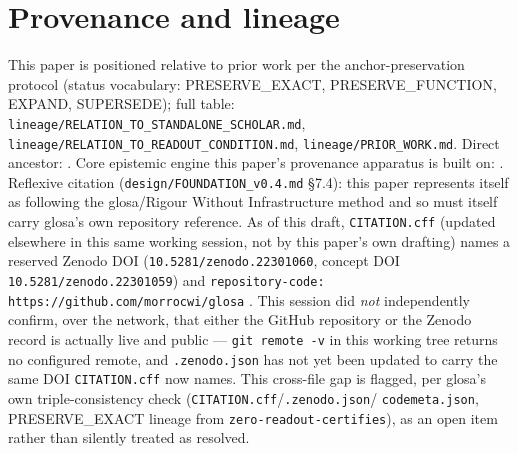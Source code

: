 \documentclass[11pt]{article}
\begin{document}
\section{Provenance and lineage}
\label{sec:provenance}
This paper is positioned relative to prior work per the anchor-preservation protocol (status
vocabulary: \textsc{PRESERVE\_EXACT}, \textsc{PRESERVE\_FUNCTION}, \textsc{EXPAND},
\textsc{SUPERSEDE}); full table: \texttt{lineage/RELATION\_TO\_STANDALONE\_SCHOLAR.md},
\texttt{lineage/RELATION\_TO\_READOUT\_CONDITION.md}, \texttt{lineage/PRIOR\_WORK.md}. Direct
ancestor: \citet{lahtee2026standalone}. Core epistemic engine this paper's provenance apparatus is
built on: \citet{lahtee2026readoutcondition}. Reflexive citation (\texttt{design/FOUNDATION\_v0.4.md}
\S7.4): this paper represents itself as following the glosa/Rigour Without Infrastructure method
and so must itself carry glosa's own repository reference. As of this draft,
\texttt{CITATION.cff} (updated elsewhere in this same working session, not by this paper's own
drafting) names a reserved Zenodo DOI (\texttt{10.5281/zenodo.22301060}, concept DOI
\texttt{10.5281/zenodo.22301059}) and \texttt{repository-code: https://github.com/morrocwi/glosa}
\citep{lahtee2026glosa}. This session did \emph{not} independently confirm, over the network, that
either the GitHub repository or the Zenodo record is actually live and public --- \texttt{git
remote -v} in this working tree returns no configured remote, and \texttt{.zenodo.json} has not
yet been updated to carry the same DOI \texttt{CITATION.cff} now names. This cross-file gap is
flagged, per glosa's own triple-consistency check (\texttt{CITATION.cff}/\texttt{.zenodo.json}/
\texttt{codemeta.json}, PRESERVE\_EXACT lineage from \texttt{zero-readout-certifies}), as an open
item rather than silently treated as resolved.



\end{document}
